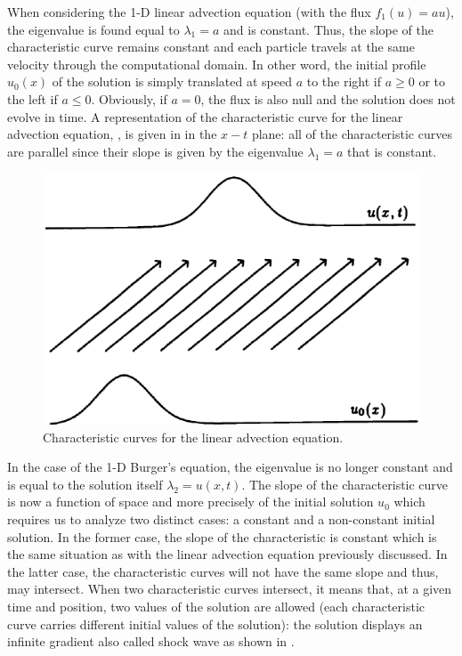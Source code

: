 When considering the 1-D linear advection equation (with the flux $f_1(u) = au$), the eigenvalue is found equal to $\lambda_1=a$ and is constant. Thus, the slope of the characteristic curve remains constant and each particle travels at the same velocity through the computational domain. In other word, the initial profile $u_0(x)$ of the solution is simply translated at speed $a$ to the right if $a \geq 0$ or to the left if $a \leq 0$. Obviously, if $a=0$, the flux is also null and the solution does not evolve in time. A representation of the characteristic curve for the linear advection equation, , is given in  in the $x-t$ plane: all of the characteristic curves are parallel since their slope is given by the eigenvalue $\lambda_1=a$ that is constant.
%
\begin{figure}[H]
\centering
\includegraphics[width=\textwidth]{figures/charact_curves_linear_transport.png}
\caption{Characteristic curves for the linear advection equation.}
\label{fig:char_curve_sct1b}
\end{figure}
%
In the case of the 1-D Burger's equation, the eigenvalue is no longer constant and is equal to the solution itself $\lambda_2 = u(x,t)$. The slope of the characteristic curve is now a function of space and more precisely of the initial solution $u_0$ which requires us to analyze two distinct cases: a constant and a non-constant initial solution. In the former case, the slope of the characteristic is constant which is the same situation as with the linear advection equation previously discussed. In the latter case, the characteristic curves will not have the same slope and thus, may intersect. When two characteristic curves intersect, it means that, at a given time and position, two values of the solution are allowed (each characteristic curve carries different initial values of the solution): the solution displays an infinite gradient also called shock wave as shown in . 
